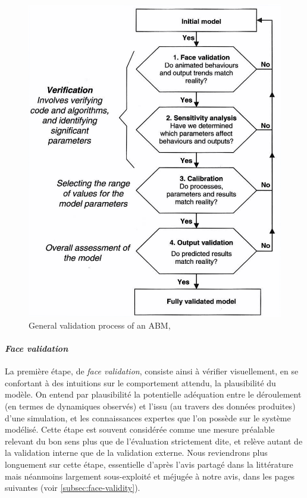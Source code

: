 \begin{figure}[H]
	\center
	\includegraphics[height=.55\textheight]{img/Schema_Ngo.png}
	\caption{\og General validation process of an ABM\fg{}, \cite[fig. 10.1 p. 183]{ngo_calibration_2012}}
	\label{fig:schema_ngo}
\end{figure}


\paragraph{\og \textit{Face validation}\fg{}}
La première étape, de \og \textit{face validation}\fg{}, consiste ainsi à vérifier visuellement, en se confortant à des intuitions sur le comportement attendu, la plausibilité du modèle.
On entend par plausibilité la potentielle adéquation entre le déroulement (en termes de dynamiques observés) et l'issu (au travers des données produites) d'une simulation, et les connaissances expertes que l'on possède sur le système modélisé.
Cette étape est souvent considérée comme une mesure préalable relevant du bon sens plus que de l'évaluation strictement dite, et relève autant de la validation interne que de la validation externe.
Nous reviendrons plus longuement sur cette étape, essentielle d'après l'avis partagé dans la littérature mais néanmoins largement sous-exploité et méjugée à notre avis, dans les pages suivantes (voir \cref{subsec:face-validity}).

